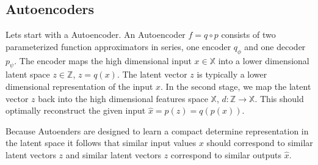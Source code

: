 \subsection{Autoencoders}


Lets start with a Autoencoder. An Autoencoder $f = q \circ p$ consists of two parameterized function approximators in series, one encoder $q_\phi$ and one decoder $p_\psi$. 
The encoder maps the high dimensional input $x \in \mathbb{X}$ into a lower dimensional latent space $z \in \mathbb{Z}$, $z = q(x)$.
The latent vector $z$ is typically a lower dimensional representation of the input $x$. 
In the second stage, we map the latent vector $z$ back into the high dimensional features space $\mathbb{X}$, $d: \mathbb{Z} \to \mathbb{X}$. This should optimally reconstruct the given input $\hat{x} = p(z) = q(p(x))$. 

Because Autoenders are designed to learn a compact determine representation in the latent space it follows that similar input values $x$ should correspond to similar latent vectors $z$ and similar latent vectors $z$ correspond to similar outputs $\hat{x}$.

